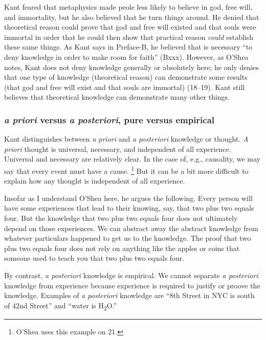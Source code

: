 \documentclass[12pt,letterpaper]{article}
\begin{document}
Kant feared that metaphysics made peole less likely to believe in god, free will, and immortality, but he also believed that he turn things around.
He denied that theoretical reason could prove that god and free will existed and that souls were immortal in order that he could then show that practical reason \textit{could} establish these same things.
As Kant says in Preface-B, he believed that is necessary ``to deny knowledge in order to make room for faith'' (Bxxx).
However, as O'Shea notes, Kant does not deny knowledge generally or absolutely here; he only denies that one type of knowledge (theoretical reason) can demonstrate some results (that god and free will exist and that souls are immortal) (18--19).
Kant still believes that theoretical knowledge can demonstrate many other things.

\subsubsection*{\textit{a priori} versus \textit{a posteriori}, pure versus empirical}

Kant distinguishes between \textit{a priori} and \textit{a posteriori} knowledge or thought.
\textit{A priori} thought is universal, necessary, and independent of all experience.
Universal and necessary are relatively clear.
In the case of, e.g., causality, we may say that every event must have a cause.%
\footnote{O'Shea uses this example on 21.}
But it can be a bit more difficult to explain how any thought is independent of all experience.

Insofar as I understand O'Shea here, he argues the following.
Every person will have some experiences that lead to their knowing, say, that two plus two equals four.
But the knowledge that two plus two equals four does not ultimately depend on those experiences.
We can abstract away the abstract knowledge from whatever particulars happened to get us to the knowledge.
The proof that two plus two equals four does not rely on anything like the apples or coins that someone used to teach you that two plus two equals four.

By contrast, \textit{a posteriori} knowledge is empirical.
We cannot separate \textit{a posteriori} knowledge from experience because experience is required to justify or proove the knowledge.
Examples of \textit{a posteriori} knowledge are ``8th Street in NYC is south of 42nd Street'' and ``water is H\textsubscript{2}O.''
\end{document}
